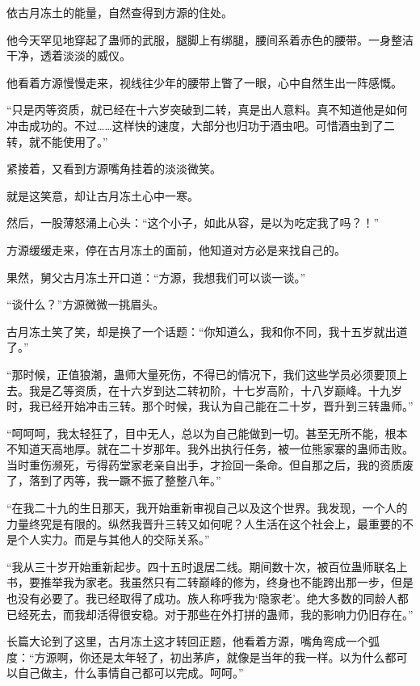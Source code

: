 
\begin{this_body}

依古月冻土的能量，自然查得到方源的住处。

他今天罕见地穿起了蛊师的武服，腿脚上有绑腿，腰间系着赤色的腰带。一身整洁干净，透着淡淡的威仪。

他看着方源慢慢走来，视线往少年的腰带上瞥了一眼，心中自然生出一阵感慨。

“只是丙等资质，就已经在十六岁突破到二转，真是出人意料。真不知道他是如何冲击成功的。不过……这样快的速度，大部分也归功于酒虫吧。可惜酒虫到了二转，就不能使用了。”

紧接着，又看到方源嘴角挂着的淡淡微笑。

就是这笑意，却让古月冻土心中一寒。

然后，一股薄怒涌上心头：“这个小子，如此从容，是以为吃定我了吗？！”

方源缓缓走来，停在古月冻土的面前，他知道对方必是来找自己的。

果然，舅父古月冻土开口道：“方源，我想我们可以谈一谈。”

“谈什么？”方源微微一挑眉头。

古月冻土笑了笑，却是换了一个话题：“你知道么，我和你不同，我十五岁就出道了。”

“那时候，正值狼潮，蛊师大量死伤，不得已的情况下，我们这些学员必须要顶上去。我是乙等资质，在十六岁到达二转初阶，十七岁高阶，十八岁巅峰。十九岁时，我已经开始冲击三转。那个时候，我认为自己能在二十岁，晋升到三转蛊师。”

“呵呵呵，我太轻狂了，目中无人，总以为自己能做到一切。甚至无所不能，根本不知道天高地厚。就在二十岁那年。我外出执行任务，被一位熊家寨的蛊师击败。当时重伤濒死，亏得药堂家老亲自出手，才捡回一条命。但自那之后，我的资质废了，落到了丙等，我一蹶不振了整整八年。”

“在我二十九的生日那天，我开始重新审视自己以及这个世界。我发现，一个人的力量终究是有限的。纵然我晋升三转又如何呢？人生活在这个社会上，最重要的不是个人实力。而是与其他人的交际关系。”

“我从三十岁开始重新起步。四十五时退居二线。期间数十次，被百位蛊师联名上书，要推举我为家老。我虽然只有二转巅峰的修为，终身也不能跨出那一步，但是也没有必要了。我已经取得了成功。族人称呼我为‘隐家老’。绝大多数的同龄人都已经死去，而我却活得很安稳。对于那些在外打拼的蛊师，我的影响力仍旧存在。”

长篇大论到了这里，古月冻土这才转回正题，他看着方源，嘴角弯成一个弧度：“方源啊，你还是太年轻了，初出茅庐，就像是当年的我一样。以为什么都可以自己做主，什么事情自己都可以完成。呵呵。”


\end{this_body}
